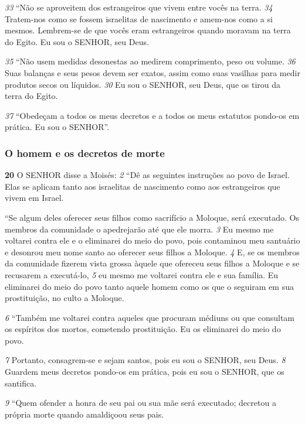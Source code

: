 \bigskip 
\textit{\tiny 33}
“Não se aproveitem dos estrangeiros que vivem entre vocês na terra.
\textit{\tiny 34}
Tratem-nos como se fossem israelitas de nascimento e amem-nos como a si
mesmos. Lembrem-se de que vocês eram estrangeiros quando moravam na terra
do Egito. Eu sou o SENHOR, seu Deus.
   
\smallskip
\textit{\tiny 35}
“Não usem medidas desonestas ao medirem comprimento, peso ou volume.
\textit{\tiny 36}
Suas balanças e seus pesos devem ser exatos, assim como suas vasilhas para
medir produtos secos ou líquidos.
\textit{\tiny 30}
 Eu sou o SENHOR, seu Deus, que os tirou da
terra do Egito.
   
\smallskip
\textit{\tiny 37}
“Obedeçam a todos os meus decretos e a todos os meus estatutos pondo-os
em prática. Eu sou o SENHOR”.

\bigskip 
\subsubsection*{O homem e os decretos de morte}
\textbf{\large 20}
 O SENHOR disse a Moisés: 
\textit{\tiny 2} 
“Dê as seguintes instruções ao povo de Israel.
Elas se aplicam tanto aos israelitas de nascimento como aos estrangeiros que
vivem em Israel.

\smallskip
   “Se algum deles oferecer seus filhos como sacrifício a Moloque, será
executado. Os membros da comunidade o apedrejarão até que ele morra. 
\textit{\tiny 3} 
Eu
mesmo me voltarei contra ele e o eliminarei do meio do povo, pois contaminou
meu santuário e desonrou meu nome santo ao oferecer seus filhos a Moloque. 
\textit{\tiny 4} 
E,
se os membros da comunidade fizerem vista grossa àquele que ofereceu seus
filhos a Moloque e se recusarem a executá-lo, 
\textit{\tiny 5} 
eu mesmo me voltarei contra ele e
sua família. Eu eliminarei do meio do povo tanto aquele homem como os que o
seguiram em sua prostituição, no culto a Moloque. 

\smallskip
\textit{\tiny 6} 
“Também me voltarei contra aqueles que procuram médiuns ou que
consultam os espíritos dos mortos, cometendo prostituição. Eu os eliminarei do
meio do povo. 

\smallskip
\textit{\tiny 7} 
Portanto, consagrem-se e sejam santos, pois eu sou o SENHOR, seu
Deus. 
\textit{\tiny 8} 
Guardem meus decretos pondo-os em prática, pois eu sou o SENHOR, que os
santifica. 

\smallskip
\textit{\tiny 9} 
“Quem ofender a honra de
 seu pai ou sua mãe será executado; decretou a
própria morte quando amaldiçoou seus pais.
   
